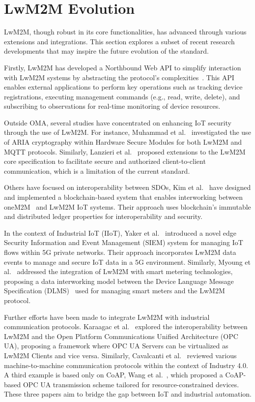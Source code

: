 \documentclass[11pt,sigconf]{iabart}
\begin{document}
\section{LwM2M Evolution} \label{extensions}

LwM2M, though robust in its core functionalities, has advanced through various extensions and integrations. This section explores a subset of recent research developments that may inspire the future evolution of the standard.

Firstly, LwM2M has developed a Northbound Web API to simplify interaction with LwM2M systems by abstracting the protocol's complexities~\cite{lwm2m-northbound-api}. This API enables external applications to perform key operations such as tracking device registrations, executing management commands (e.g., read, write, delete), and subscribing to observations for real-time monitoring of device resources.

Outside OMA, several studies have concentrated on enhancing IoT security through the use of LwM2M. For instance, Muhammad et al.~\cite{pop00001} investigated the use of ARIA cryptography within Hardware Secure Modules for both LwM2M and MQTT protocols. Similarly, Lanzieri et al.~\cite{pop00011} proposed extensions to the LwM2M core specification to facilitate secure and authorized client-to-client communication, which is a limitation of the current standard.

Others have focused on interoperability between SDOs, Kim et al.~\cite{pop00007} have designed and implemented a blockchain-based system that enables interworking between oneM2M~\cite{oneM2M-spec} and LwM2M IoT systems. Their approach uses blockchain's immutable and distributed ledger properties for interoperability and security. 

In the context of Industrial IoT (IIoT), Yaker et al.~\cite{pop00004} introduced a novel edge Security Information and Event Management (SIEM) system for managing IoT flows within 5G private networks. Their approach incorporates LwM2M data events to manage and secure IoT data in a 5G environment. Similarly, Myoung et al.~\cite{pop00012} addressed the integration of LwM2M with smart metering technologies, proposing a data interworking model between the Device Language Message Specification (DLMS)~\cite{dlms-spec} used for managing smart meters and the LwM2M protocol.

Further efforts have been made to integrate LwM2M with industrial communication protocols. Karaagac et al.~\cite{pop00013} explored the interoperability between LwM2M and the Open Platform Communications Unified Architecture (OPC UA), proposing a framework where OPC UA Servers can be virtualized as LwM2M Clients and vice versa. Similarly, Cavalcanti et al.~\cite{pop00014} reviewed various machine-to-machine communication protocols within the context of Industry 4.0. A third example is based only on CoAP, Wang et al.~\cite{pop00015}, which proposed a CoAP-based OPC UA transmission scheme tailored for resource-constrained devices. These three papers aim to bridge the gap between IoT and industrial automation.
\end{document}
